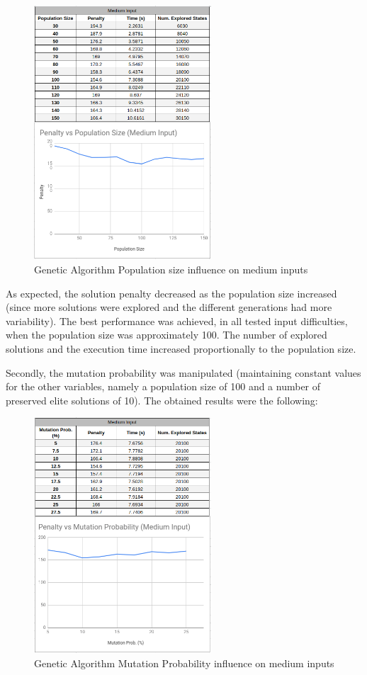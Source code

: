\documentclass[conference]{IEEEtran}
\begin{document}
\begin{figure}[H]
    \centerline{\includegraphics[width=250px]{genetic_pop_size_medium.png}}
    \caption{Genetic Algorithm Population size influence on medium inputs}
\end{figure}

As expected, the solution penalty decreased as the population size increased (since more solutions were explored and the different generations had more variability). The best performance was achieved, in all tested input difficulties, when the population size was approximately 100. The number of explored solutions and the execution time increased proportionally to the population size. 

Secondly, the mutation probability was manipulated (maintaining constant values for the other variables, namely a population size of 100 and a number of preserved elite solutions of 10). The obtained results were the following: 

\begin{figure}[H]
    \centerline{\includegraphics[width=250px]{mutation_prob_medium.png}}
    \caption{Genetic Algorithm Mutation Probability influence on medium inputs}
\end{figure}
\end{document}
